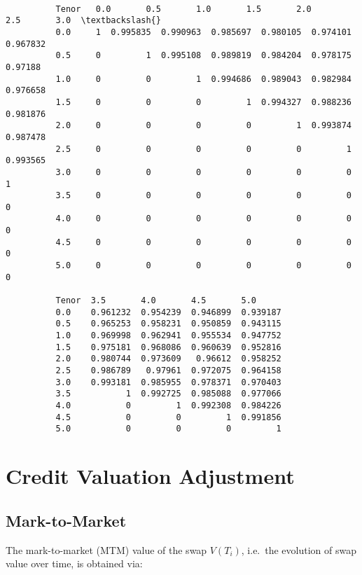 \documentclass[reqno]{article}
\begin{document}
{ \small
            \begin{Verbatim}[commandchars=\\\{\}]

          Tenor   0.0       0.5       1.0       1.5       2.0       2.5       3.0  \textbackslash{}
          0.0     1  0.995835  0.990963  0.985697  0.980105  0.974101  0.967832
          0.5     0         1  0.995108  0.989819  0.984204  0.978175   0.97188
          1.0     0         0         1  0.994686  0.989043  0.982984  0.976658
          1.5     0         0         0         1  0.994327  0.988236  0.981876
          2.0     0         0         0         0         1  0.993874  0.987478
          2.5     0         0         0         0         0         1  0.993565
          3.0     0         0         0         0         0         0         1
          3.5     0         0         0         0         0         0         0
          4.0     0         0         0         0         0         0         0
          4.5     0         0         0         0         0         0         0
          5.0     0         0         0         0         0         0         0

          Tenor  3.5       4.0       4.5       5.0
          0.0    0.961232  0.954239  0.946899  0.939187
          0.5    0.965253  0.958231  0.950859  0.943115
          1.0    0.969998  0.962941  0.955534  0.947752
          1.5    0.975181  0.968086  0.960639  0.952816
          2.0    0.980744  0.973609   0.96612  0.958252
          2.5    0.986789   0.97961  0.972075  0.964158
          3.0    0.993181  0.985955  0.978371  0.970403
          3.5           1  0.992725  0.985088  0.977066
          4.0           0         1  0.992308  0.984226
          4.5           0         0         1  0.991856
          5.0           0         0         0         1
\end{Verbatim}

}

    \section{Credit Valuation Adjustment}\label{cva}

    \subsection{Mark-to-Market}\label{mtm-of-the-irs}

    The mark-to-market (MTM) value of the swap \(V(T_i)\), i.e.~the evolution of
swap value over time, is obtained via:
\end{document}
